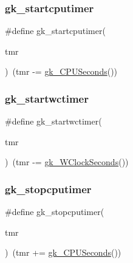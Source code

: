\subsubsection{\texorpdfstring{gk\+\_\+startcputimer}{gk\_startcputimer}}
{\footnotesize\ttfamily \#define gk\+\_\+startcputimer(\begin{DoxyParamCaption}\item[{}]{tmr }\end{DoxyParamCaption})~(tmr -\/= \hyperlink{a00158_a3e9b43a695411f5f0b3396083fe688d6}{gk\+\_\+\+C\+P\+U\+Seconds}())}

\mbox{\label{a00053_a62391ec1e07912f942d70c2015756c62}} 
\subsubsection{\texorpdfstring{gk\+\_\+startwctimer}{gk\_startwctimer}}
{\footnotesize\ttfamily \#define gk\+\_\+startwctimer(\begin{DoxyParamCaption}\item[{}]{tmr }\end{DoxyParamCaption})~(tmr -\/= \hyperlink{a00158_abc56539a50e81723bb4f80b5529708d0}{gk\+\_\+\+W\+Clock\+Seconds}())}

\mbox{\label{a00053_acc9b1a073612fb69a4b4adef68c51439}} 
\subsubsection{\texorpdfstring{gk\+\_\+stopcputimer}{gk\_stopcputimer}}
{\footnotesize\ttfamily \#define gk\+\_\+stopcputimer(\begin{DoxyParamCaption}\item[{}]{tmr }\end{DoxyParamCaption})~(tmr += \hyperlink{a00158_a3e9b43a695411f5f0b3396083fe688d6}{gk\+\_\+\+C\+P\+U\+Seconds}())}

\mbox{\label{a00053_a58435b46c1a70f7bf3f40e8c6adfdf46}} 
